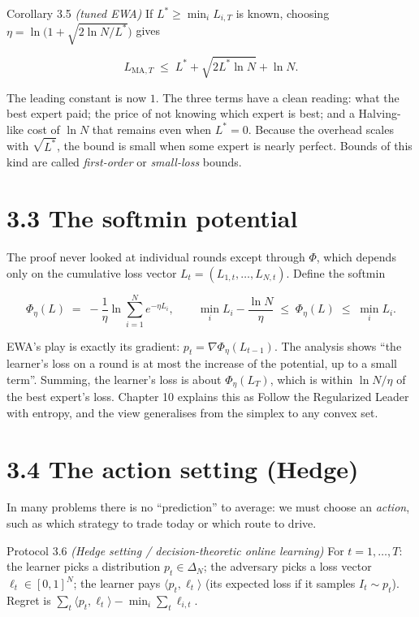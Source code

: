 \documentclass[11pt,a4paper,openany]{book}
\newcommand{\ip}[2]{\langle #1,#2\rangle}
\newcommand{\simplex}{\Delta}
\begin{document}
\begin{bthm}{Corollary 3.5 \emph{(tuned EWA)}}
If $L^*\ge\min_iL_{i,T}$ is known, choosing $\eta=\ln\big(1+\sqrt{2\ln N/L^*}\big)$ gives

\[L_{\mathrm{MA},T}\;\le\;L^*+\sqrt{2L^*\ln N}+\ln N.\]

\end{bthm}

The leading constant is now $1$. The three terms have a clean reading: what the best expert paid; the price of not knowing which expert is best; and a Halving-like cost of $\ln N$ that remains even when $L^*=0$. Because the overhead scales with $\sqrt{L^*}$, the bound is small when some expert is nearly perfect. Bounds of this kind are called \emph{first-order} or \emph{small-loss} bounds.

\section*{3.3 The softmin potential}\label{ch3-potential}

The proof never looked at individual rounds except through $\Phi$, which depends only on the cumulative loss vector $L_t=(L_{1,t},\dots,L_{N,t})$. Define the softmin

\[\Phi_\eta(L)\;=\;-\frac1\eta\ln\sum_{i=1}^Ne^{-\eta L_i},\qquad \min_iL_i-\frac{\ln N}{\eta}\;\le\;\Phi_\eta(L)\;\le\;\min_iL_i.\]

EWA's play is exactly its gradient: $p_t=\nabla\Phi_\eta(L_{t-1})$. The analysis shows ``the learner's loss on a round is at most the increase of the potential, up to a small term''. Summing, the learner's loss is about $\Phi_\eta(L_T)$, which is within $\ln N/\eta$ of the best expert's loss. Chapter 10 explains this as Follow the Regularized Leader with entropy, and the view generalises from the simplex to any convex set.

\section*{3.4 The action setting (Hedge)}\label{ch3-hedge}

In many problems there is no ``prediction'' to average: we must choose an \emph{action}, such as which strategy to trade today or which route to drive.

\begin{bdef}{Protocol 3.6 \emph{(Hedge setting / decision-theoretic online learning)}}
For $t=1,\dots,T$: the learner picks a distribution $p_t\in\simplex_N$; the adversary picks a loss vector $\ell_t\in[0,1]^N$; the learner pays $\ip{p_t}{\ell_t}$ (its expected loss if it samples $I_t\sim p_t$). Regret is $\sum_t\ip{p_t}{\ell_t}-\min_i\sum_t\ell_{i,t}$.
\end{bdef}
\end{document}
